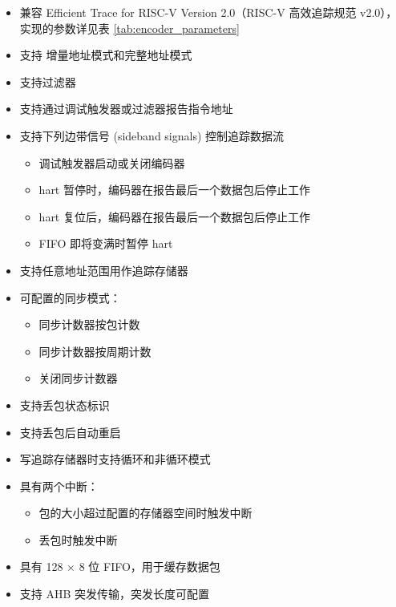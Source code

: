 \documentclass[main\_\_CN.tex]{subfiles}
\begin{document}
\begin{itemize}
    \item 兼容 Efficient Trace for RISC-V Version 2.0（RISC-V 高效追踪规范 v2.0），实现的参数详见表 \ref{tab:encoder_parameters}
    \item 支持 增量地址模式和完整地址模式
    \item 支持过滤器
    \item 支持通过调试触发器或过滤器报告指令地址
    \item 支持下列边带信号 (sideband signals) 控制追踪数据流
        \begin{itemize}
            \item 调试触发器启动或关闭编码器
            \item hart 暂停时，编码器在报告最后一个数据包后停止工作
            \item hart 复位后，编码器在报告最后一个数据包后停止工作
            \item FIFO 即将变满时暂停 hart
        \end{itemize}
    \item 支持任意地址范围用作追踪存储器
    \item 可配置的同步模式：
        \begin{itemize}
            \item 同步计数器按包计数
            \item 同步计数器按周期计数
            \item 关闭同步计数器
        \end{itemize}
    \item 支持丢包状态标识
    \item 支持丢包后自动重启
    \item 写追踪存储器时支持循环和非循环模式
    \item 具有两个中断：
        \begin{itemize}
            \item 包的大小超过配置的存储器空间时触发中断
            \item 丢包时触发中断
        \end{itemize}
    \item 具有 128 × 8 位 FIFO，用于缓存数据包
    \item 支持 AHB 突发传输，突发长度可配置
\end{itemize}
\end{document}
